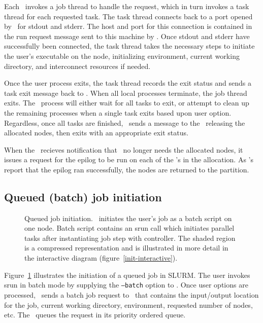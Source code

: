 Each \slurmd\ invokes a job thread to handle the request, which in turn
invokes a task thread for each requested task. The task thread connects
back to a port opened by \srun\ for stdout and stderr. The host and
port for this connection is contained in the run request message sent
to this machine by \srun . Once stdout and stderr have successfully 
been connected, the task thread takes the necessary steps to initiate 
the user's executable on the node, initializing environment, current
working directory, and interconnect resources if needed. 

Once the user process exits, the task thread records the exit status and
sends a task exit message back to \srun . When all local processes
terminate, the job thread exits. The \srun\ process will either wait
for all tasks to exit, or attempt to clean up the remaining processes
when a single task exits based upon user option. Regardless, once all
tasks are finished, \srun\ sends a message to the \slurmctld\ releasing
the allocated nodes, then exits with an appropriate exit status.

When the \slurmctld\ recieves notification that \srun\ no longer needs
the allocated nodes, it issues a request for the epilog to be run on each of
the \slurmd 's in the allocation. As \slurmd 's report that the epilog ran
successfully, the nodes are returned to the partition.

\subsection{Queued (batch) job initiation}

\begin{figure}[tb]
\centerline{ }
\caption{\small Queued job initiation. 
         \slurmctld\ initiates the user's job as a batch script on one node. 
	 Batch script contains an srun call which initiates parallel tasks 
	 after instantiating job step with controller. The shaded region is 
	 a compressed representation and is illustrated in more detail in the 
	 interactive diagram (figure~\ref{init-interactive}).}
\label{init-batch}
\end{figure}

Figure~\ref{init-batch} illustrates the initiation of a queued job in SLURM.
The user invokes srun in batch mode by supplying the {\tt --batch} option 
to \srun . Once user options are processed, \srun\ sends a batch job request
to \slurmctld\ that contains the input/output location for the job, current
working directory, environment, requested number of nodes, etc. The 
\slurmctld\ queues the request in its priority ordered queue. 

